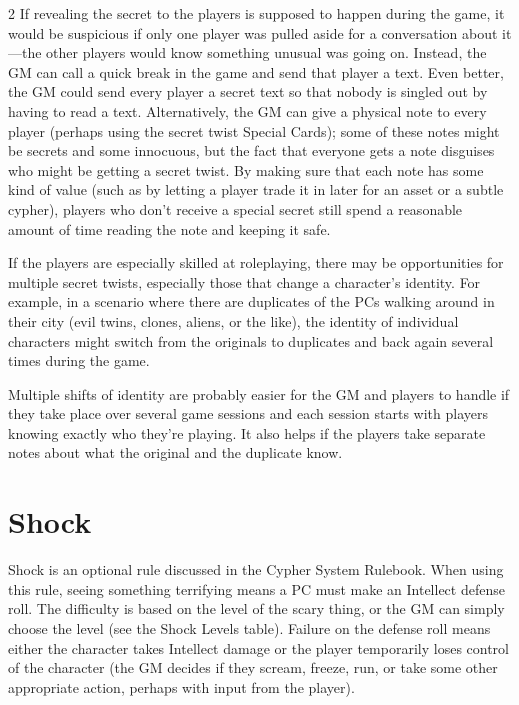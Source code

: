 \begin{multicols}{2}
If revealing the secret to the players is supposed to happen during the game, it would be suspicious if only one player was pulled aside for a conversation about it—the other players would know something unusual was going on. Instead, the GM can call a quick break in the game and send that player a text. Even better, the GM could send every player a secret text so that nobody is singled out by having to read a text. Alternatively, the GM can give a physical note to every player (perhaps using the secret twist Special Cards); some of these notes might be secrets and some innocuous, but the fact that everyone gets a note disguises who might be getting a secret twist. By making sure that each note has some kind of value (such as by letting a player trade it in later for an asset or a subtle cypher), players who don’t receive a special secret still spend a reasonable amount of time reading the note and keeping it safe.

If the players are especially skilled at roleplaying, there may be opportunities for multiple secret twists, especially those that change a character’s identity. For example, in a scenario where there are duplicates of the PCs walking around in their city (evil twins, clones, aliens, or the like), the identity of individual characters might switch from the originals to duplicates and back again several times during the game.

Multiple shifts of identity are probably easier for the GM and players to handle if they take place over several game sessions and each session starts with players knowing exactly who they’re playing. It also helps if the players take separate notes about what the original and the duplicate know.

\section{Shock}

Shock is an optional rule discussed in the Cypher System Rulebook. When using this rule, seeing something terrifying means a PC must make an Intellect defense roll. The difficulty is based on the level of the scary thing, or the GM can simply choose the level (see the Shock Levels table). Failure on the defense roll means either the character takes Intellect damage or the player temporarily loses control of the character (the GM decides if they scream, freeze, run, or take some other appropriate action, perhaps with input from the player).

\end{multicols}

